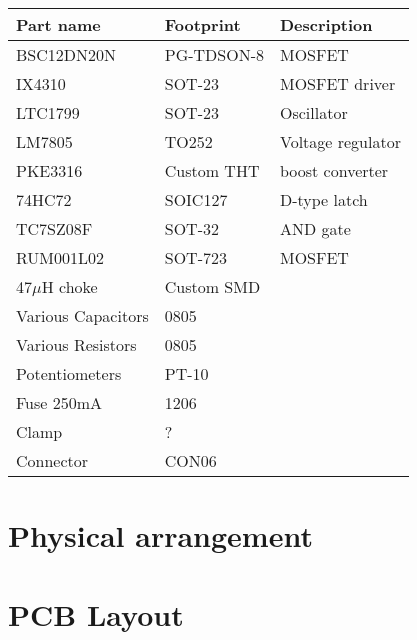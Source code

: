 \begin{tabular}{@{}lll@{}}
    \toprule
    \textbf{Part name} & \textbf{Footprint} & \textbf{Description}\\\midrule
    BSC12DN20N & PG-TDSON-8 & MOSFET\\
    IX4310 & SOT-23 & MOSFET driver\\
    LTC1799 & SOT-23 & Oscillator\\
    LM7805 & TO252 & Voltage regulator\\
    PKE3316 & Custom THT & boost converter\\
    74HC72 & SOIC127 & D-type latch\\
    TC7SZ08F & SOT-32 & AND gate\\
    RUM001L02 & SOT-723 & MOSFET\\
    47\(\mu\)H choke & Custom SMD &\\
    Various Capacitors & 0805 &\\
    Various Resistors & 0805 &\\
    Potentiometers & PT-10&\\
    Fuse 250mA & 1206 &\\
    Clamp & ? &\\
    Connector & CON06 &\\
    \bottomrule
\end{tabular}

\section{Physical arrangement}

\section{PCB Layout}


